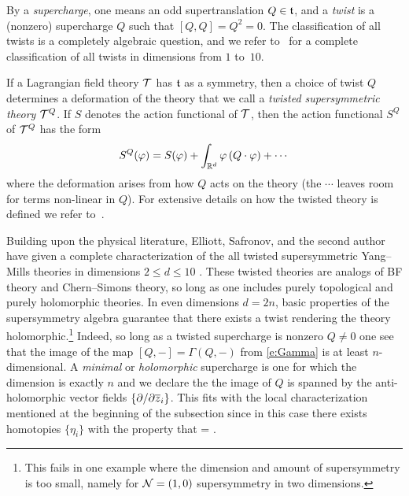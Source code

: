 \documentclass[11pt]{amsart}
\def\del{\partial}
\begin{document}
By a {\em supercharge}, one means an odd supertranslation $Q \in \mathfrak t$, and
a {\em twist} is a (nonzero) supercharge $Q$ such that $[Q,Q] = Q^2 = 0$. 
The classification of all twists is a completely algebraic question,
and we refer to~\autocite{ESsusy} for a complete classification of all twists in dimensions from $1$ to~$10$. 

If a Lagrangian field theory $\mathcal T$ has $\mathfrak t$ as a symmetry, 
then a choice of twist $Q$ determines a deformation of the theory that we call a {\em twisted supersymmetric theory} $\mathcal T^Q$.
If $S$ denotes the action functional of $\mathcal T$, then the action functional $S^Q$ of $\mathcal T^Q$ has the form
\[
S^Q(\varphi) = S(\varphi) + \int_{\mathbb R^d} \varphi  \left(Q \cdot \varphi \right) + \cdots 
\]
where the deformation arises from how $Q$ acts on the theory 
(the $\cdots$ leaves room for terms non-linear in $Q$).
For extensive details on how the twisted theory is defined we refer to~\autocite{CostelloHolomorphic, ESW}. 

Building upon the physical literature, Elliott, Safronov, and the second author have given a complete characterization of the all twisted supersymmetric Yang--Mills theories in dimensions $2 \leq d \leq 10$ \autocite{ESW}. 
These twisted theories are analogs of BF theory and Chern--Simons theory, so long as one includes purely topological and purely holomorphic theories.
In even dimensions $d = 2n$, basic properties of the supersymmetry algebra guarantee that there exists a twist rendering the theory holomorphic.\footnote{This fails in one example where the dimension and amount of supersymmetry is too small, namely for $\mathcal N=(1,0)$ supersymmetry in two dimensions.}
Indeed, so long as a twisted supercharge is nonzero $Q \ne 0$ one see that the image of the map $[Q,-] = \Gamma(Q,-)$ from \eqref{e:Gamma} is at least $n$-dimensional.
A {\em minimal} or {\em holomorphic} supercharge is one for which the dimension is exactly $n$ and we declare the the image of $Q$ is spanned by the anti-holomorphic vector fields $\{\del / \del \zbar_i\}$.
This fits with the local characterization mentioned at the beginning of the subsection since in this case there exists homotopies $\{\eta_i\}$ with the property that 
\beqn
[Q,\eta_i] = \frac{\del}{\del \zbar_i} .
\eeqn 

\end{document}
